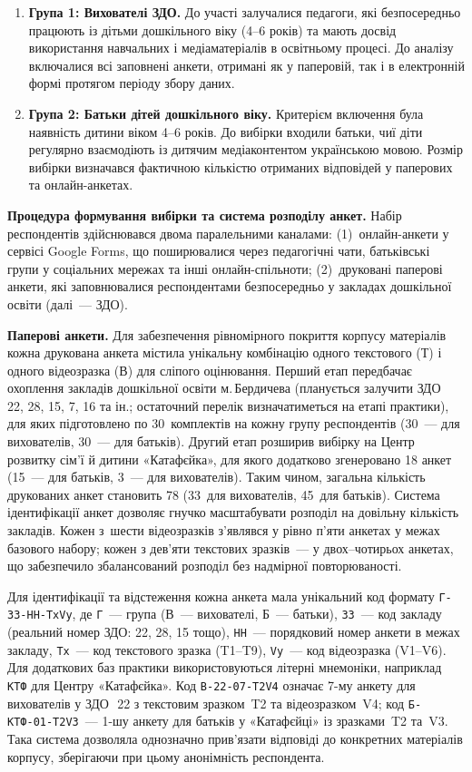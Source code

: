 \documentclass[14pt, a4paper]{extreport}
\begin{document}
\begin{enumerate}
  \item \textbf{Група 1: Вихователі ЗДО.} До участі залучалися педагоги, які безпосередньо працюють із дітьми дошкільного віку (4--6 років) та мають досвід використання навчальних і медіаматеріалів в освітньому процесі. До аналізу включалися всі заповнені анкети, отримані як у паперовій, так і в електронній формі протягом періоду збору даних.
  
  \item \textbf{Група 2: Батьки дітей дошкільного віку.} Критерієм включення була наявність дитини віком 4--6 років. До вибірки входили батьки, чиї діти регулярно взаємодіють із дитячим медіаконтентом українською мовою. Розмір вибірки визначався фактичною кількістю отриманих відповідей у паперових та онлайн-анкетах.
\end{enumerate}

\textbf{Процедура формування вибірки та система розподілу анкет.}
Набір респондентів здійснювався двома паралельними каналами: (1)~онлайн-анкети у сервісі Google Forms, що поширювалися через педагогічні чати, батьківські групи у соціальних мережах та інші онлайн-спільноти; (2)~друковані паперові анкети, які заповнювалися респондентами безпосередньо у закладах дошкільної освіти (далі~--- ЗДО).

\textbf{Паперові анкети.} Для забезпечення рівномірного покриття корпусу матеріалів кожна друкована анкета містила унікальну комбінацію одного текстового (Т) і одного відеозразка (В) для сліпого оцінювання. Перший етап передбачає охоплення закладів дошкільної освіти м.\,Бердичева (планується залучити ЗДО~\textnumero\textnumero\,22, 28, 15, 7, 16 та ін.; остаточний перелік визначатиметься на етапі практики), для яких підготовлено по 30~комплектів на кожну групу респондентів (30~--- для вихователів, 30~--- для батьків). Другий етап розширив вибірку на Центр розвитку сім'ї й дитини «Катафєйка», для якого додатково згенеровано 18 анкет (15~--- для батьків, 3~--- для вихователів). Таким чином, загальна кількість друкованих анкет становить 78 (33~для вихователів, 45~для батьків). Система ідентифікації анкет дозволяє гнучко масштабувати розподіл на довільну кількість закладів. Кожен з~шести відеозразків з'являвся у рівно п'яти анкетах у межах базового набору; кожен з дев'яти текстових зразків~--- у двох--чотирьох анкетах, що забезпечило збалансований розподіл без надмірної повторюваності.

Для ідентифікації та відстеження кожна анкета мала унікальний код формату \texttt{Г-ЗЗ-НН-TxVy}, де \texttt{Г}~--- група (В~--- вихователі, Б~--- батьки), \texttt{ЗЗ}~--- код закладу (реальний номер ЗДО: 22, 28, 15 тощо), \texttt{НН}~--- порядковий номер анкети в межах закладу, \texttt{Tx}~--- код текстового зразка (T1--T9), \texttt{Vy}~--- код відеозразка (V1--V6). Для додаткових баз практики використовуються літерні мнемоніки, наприклад \texttt{КТФ} для Центру «Катафєйка». Код \texttt{В-22-07-T2V4} означає 7-му анкету для вихователів у ЗДО~\textnumero\,22 з текстовим зразком~T2 та відеозразком~V4; код \texttt{Б-КТФ-01-T2V3}~--- 1-шу анкету для батьків у «Катафєйці» із зразками~T2 та~V3. Така система дозволяла однозначно прив'язати відповіді до конкретних матеріалів корпусу, зберігаючи при цьому анонімність респондента.
\end{document}
